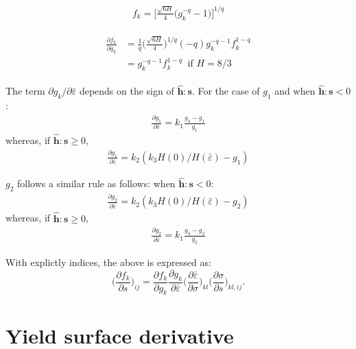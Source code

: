 \documentclass[12pt]{amsart}
\begin{document}
\begin{eqnarray}
  \label{eq:fk1}
  f_k = \bigg[ \frac{\sqrt{6H}}{4}   \Big(  g_k^{-q} - 1  \Big)  \bigg] ^{1/q}
\end{eqnarray}


\begin{eqnarray}
  \label{eq:fk2}
  \begin{split}
  \frac{\partial f_k}{\partial{g_k}} &= \frac{1}{q}   \bigg(\frac{\sqrt{6H}}{4} \bigg)^{1/q}  (-q) g_k^{-q-1}    f_k^{1-q}\\
  &=g_k^{-q-1} f_k^{1-q}  \ \text{  if } H=8/3
  \end{split}
\end{eqnarray}

The term $  \partial{g_k}/\partial{\bar{\varepsilon}} $ depends on the sign of $\hat{\mathbf{h}}:\mathbf{s}$.
For the case of $g_1$ and when  $\hat{\mathbf{h}}:\mathbf{s}<0$:
\begin{eqnarray}
  \label{eq:dbau2}
\frac{\partial{g_1}}{\partial{\bar{\varepsilon}}}=k_1 \frac{g_4-g_1}{g_1}
\end{eqnarray}
whereas, if $\hat{\mathbf{h}}:\mathbf{s}\ge0$,
\begin{eqnarray}
  \label{eq:dbau3}
\frac{\partial{g_1}}{\partial{\bar{\varepsilon}}}=k_2 (k_3 H(0)/H(\bar{\varepsilon})-g_1)
\end{eqnarray}


$g_2$ follows a similar rule as follows:
when  $\hat{\mathbf{h}}:\mathbf{s}<0$:
\begin{eqnarray}
  \label{eq:dbau4}
  \frac{\partial{g_2}}{\partial{\bar{\varepsilon}}}=k_2 (k_3 H(0)/H(\bar{\varepsilon})-g_2)
\end{eqnarray}
whereas, if $\hat{\mathbf{h}}:\mathbf{s}\ge0$,
\begin{eqnarray}
  \label{eq:dbau5}
  \frac{\partial{g_2}}{\partial{\bar{\varepsilon}}}=k_1 \frac{g_3-g_2}{g_2}
\end{eqnarray}

With explictly indices, the above is expressed as:
\begin{equation}
  \label{eq:dphib8}
  \bigg(\frac{\partial f_k}{\partial s}\bigg)_{ij} = \frac{\partial f_k}{\partial g_k} \frac{\partial g_k}{\partial \bar{\varepsilon}}  \bigg(\frac{\partial\bar{\varepsilon}}{\partial\sigma}\bigg)_{kl} \bigg(\frac{\partial\sigma}{\partial s}\bigg)_{kl,ij}.
\end{equation}


\newpage
\section{Yield surface derivative}
\end{document}
